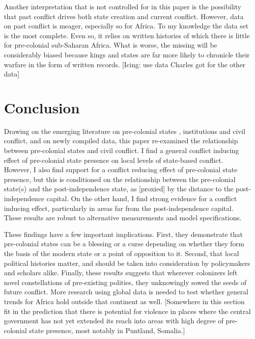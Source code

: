 \documentclass[12pt]{article}
\begin{document}
Another interpretation that is not controlled for in this paper is the
possibility that past conflict drives both state creation and current conflict.
However, data on past conflict is meager, especially so for Africa. To my
knowledge the \citet{Brecke1999} data set is the most complete. Even so, it
relies on written histories of which there is little for pre-colonial
sub-Saharan Africa. What is worse, the missing will be considerably biased
because kings and states are far more likely to chronicle their warfare in the
form of written records. [Icing: use data Charles got for the other data]

\section{Conclusion} \label{Conclusion}

Drawing on the emerging literature on pre-colonial states \citep{Paine2019,
Depetris-Chauvin2016}, institutions \citep{Wig2016, Englebert2002,
Michalopoulos2018} and civil conflict, and on newly compiled data, this paper
re-examined the relationship between pre-colonial states and civil conflict. I
find a general conflict inducing effect of pre-colonial state presence on local
levels of state-based conflict. However, I also find support for a conflict
reducing effect of pre-colonial state presence, but this is conditioned on the
relationship between the pre-colonial state(s) and the post-independence state,
as [proxied] by the distance to the post-independence capital. On the other
hand, I find strong evidence for a conflict inducing effect, particularly in
areas far from the post-independence capital. These results are robust to
alternative measurements and model specifications.

These findings have a few important implications. First, they demonstrate that
pre-colonial states can be a blessing or a curse depending on whether they form
the basis of the modern state or a point of opposition to it. Second, that local
political histories matter, and should be taken into consideration by
policymakers and scholars alike. Finally, these results suggests that wherever
colonizers left novel constellations of pre-existing polities, they unknowingly
sowed the seeds of future conflict. More research using global data is needed to
test whether general trends for Africa hold outside that continent as well.
[Somewhere in this section fit in the prediction that there is potential for
violence in places where the central government has not yet extended its reach
into areas with high degree of pre-colonial state presence, most notably in
Puntland, Somalia.]
\end{document}
